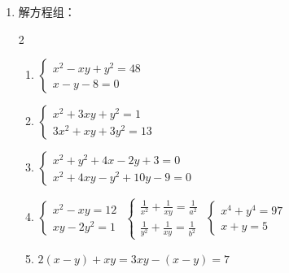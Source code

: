 \begin{enumerate}
\item 解方程组：
\begin{multicols}{2}
  \begin{enumerate}
\item $\begin{cases}x^{2}-x y+y^{2}=48 \\ x-y-8=0\end{cases}$
\item $\begin{cases}x^{2}+3 x y+y^{2}=1 \\ 3 x^{2}+x y+3 y^{2}=13\end{cases}$
\item $\begin{cases}x^{2}+y^{2}+4 x-2 y+3=0 \\ x^{2}+4 x y-y^{2}+10 y-9=0\end{cases}$
\item $\begin{cases}x^{2}-x y=12 \\ x y-2 y^{2}=1\end{cases}$
\staritem $\begin{cases}\frac{1}{x^{2}}+\frac{1}{x y}=\frac{1}{a^{2}}\\
    \frac{1}{y^{2}}+\frac{1}{x y}=\frac{1}{b^{2}}
\end{cases}$
\staritem $\begin{cases}x^{4}+y^{4}=97 \\ x+y=5\end{cases}$
\item $2(x-y)+x y=3 x y-(x-y)=7$
\end{enumerate}  
\end{multicols}

\end{enumerate}